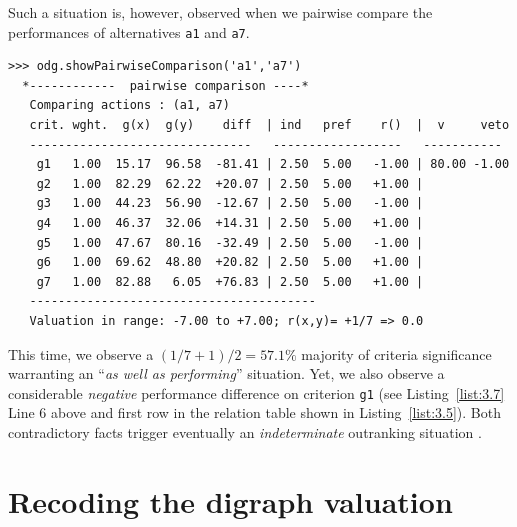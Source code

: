 Such a situation is, however, observed when we pairwise compare the performances of alternatives \texttt{a1} and \texttt{a7}.
\begin{lstlisting}[caption={Pairwise comparison with considerable performance difference},label=list:3.7,basicstyle=\scriptsize]
>>> odg.showPairwiseComparison('a1','a7')
  *------------  pairwise comparison ----*
   Comparing actions : (a1, a7)
   crit. wght.  g(x)  g(y)    diff  | ind   pref    r()  |  v     veto
   -------------------------------   ------------------   -----------
    g1   1.00  15.17  96.58  -81.41 | 2.50  5.00   -1.00 | 80.00 -1.00
    g2   1.00  82.29  62.22  +20.07 | 2.50  5.00   +1.00 | 
    g3   1.00  44.23  56.90  -12.67 | 2.50  5.00   -1.00 | 
    g4   1.00  46.37  32.06  +14.31 | 2.50  5.00   +1.00 | 
    g5   1.00  47.67  80.16  -32.49 | 2.50  5.00   -1.00 | 
    g6   1.00  69.62  48.80  +20.82 | 2.50  5.00   +1.00 | 
    g7   1.00  82.88   6.05  +76.83 | 2.50  5.00   +1.00 | 
   ----------------------------------------
   Valuation in range: -7.00 to +7.00; r(x,y)= +1/7 => 0.0
\end{lstlisting}
This time, we observe a $(1/7 + 1)/2 = 57.1\%$ majority of criteria significance warranting an ``\emph{as well as performing}'' situation. Yet, we also observe a considerable \emph{negative} performance difference on criterion \texttt{g1} (see Listing~\ref{list:3.7} Line 6 above and first row in the relation table shown in Listing~\ref{list:3.5}). Both contradictory facts trigger eventually an \emph{indeterminate} outranking situation \citep{BIS-2013}. 

\section{Recoding the digraph valuation}
\label{sec:3.4}

